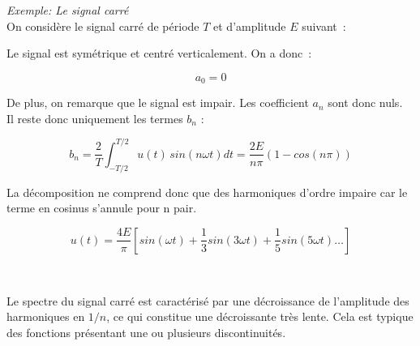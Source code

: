 \textit{Exemple: Le signal carré}\\

On considère le signal carré de période $T$ et d'amplitude $E$ suivant~: 

\begin{center}

\end{center}

Le signal est symétrique et centré verticalement. On a donc~:

$$a_0 = 0$$

De plus, on remarque que le signal est impair. Les coefficient $a_n$ sont donc nuls. \\ Il reste donc uniquement les termes $b_n$ :

$$ b_n = \dfrac{2}{T} \int_{-T/2}^{T/2} u(t)\,sin(n\omega t)dt = \dfrac{2E}{n\pi} \left( 1 - cos(n\pi) \right) $$

La décomposition ne comprend donc que des harmoniques d'ordre impaire car le terme en cosinus s'annule pour n pair.\\

\begin{minipage}{0.4\textwidth}
\begin{center}

\end{center}
\end{minipage}
\begin{minipage}{0.5\textwidth}
	$$ u(t) = \dfrac{4E}{\pi}\left[ sin(\omega t) + \dfrac{1}{3} sin ( 3\omega t ) + \dfrac{1}{5} sin( 5 \omega t ) \dots \right] $$
\end{minipage}\\

\bigskip

Le spectre du signal carré est caractérisé par une décroissance de l'amplitude des harmoniques en $1/n$, ce qui constitue une décroissante très lente. Cela est typique des fonctions présentant une ou plusieurs discontinuités. 

